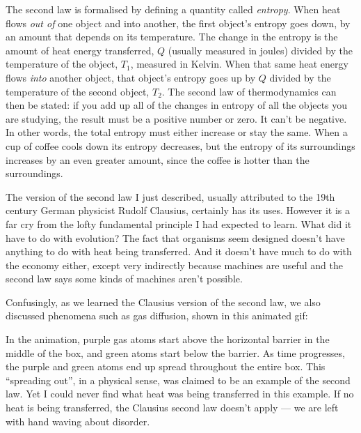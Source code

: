 \documentclass[a4paper, 12pt]{article}
\begin{document}
The second law is formalised by defining a quantity called
{\em entropy}. When heat flows {\em out of} one object and into another,
the first object's entropy goes
down, by an amount that depends on its temperature.
The change in the entropy is the amount of heat energy transferred,
$Q$ (usually measured in joules)
divided by the temperature of the object, $T_1$, measured in Kelvin.
When that same heat energy flows {\em into} another object, that object's
entropy goes up by $Q$ divided by the temperature of the
second object, $T_2$. The second law of thermodynamics can then be stated: if you
add up all of the changes in entropy of all the objects you are studying,
the result must be a positive number or zero. It can't be negative. In other
words, the total entropy must either increase or stay the same.
When a cup of coffee cools down its entropy decreases, but the entropy of its
surroundings increases by an even greater amount,
since the coffee is hotter than the surroundings.

The version of
the second law I just described, usually attributed to the 19th century
German physicist Rudolf Clausius, certainly has its uses. However it is a far
cry from the lofty fundamental principle I had expected to learn. What did it
have to do with evolution? The fact that organisms seem designed doesn't have
anything to do with heat being transferred. And it doesn't have much to do
with the economy either, except very indirectly because machines are useful
and the second law says some kinds of machines aren't possible.

Confusingly, as we learned the Clausius version of the second law, we also
discussed phenomena such as gas diffusion, shown in this animated gif:

\begin{figure}[ht!]
\centering
{}
\end{figure}

In the animation, purple gas atoms start above the horizontal barrier in the
middle of the box, and green atoms start below the barrier.
As time progresses, the purple and green atoms end up spread throughout the entire
box. This ``spreading out'', in a physical sense, was claimed to be an example
of the second law. Yet I could never find what heat was being transferred
in this example. If no heat is being transferred, the Clausius second law
doesn't apply --- we are left with hand waving about disorder.
\end{document}
